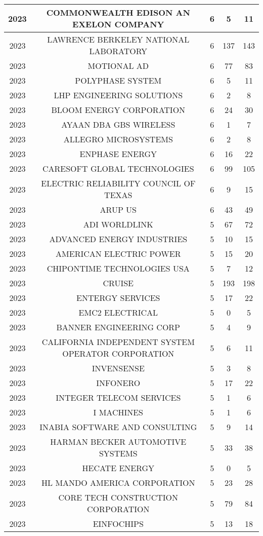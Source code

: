 \documentclass{article}%
\begin{document}
\begin{longtable}{c|c|c|c|c}
2023&COMMONWEALTH EDISON AN EXELON COMPANY&6&5&11\\%
\hline%
2023&LAWRENCE BERKELEY NATIONAL LABORATORY&6&137&143\\%
\hline%
2023&MOTIONAL AD&6&77&83\\%
\hline%
2023&POLYPHASE SYSTEM&6&5&11\\%
\hline%
2023&LHP ENGINEERING SOLUTIONS&6&2&8\\%
\hline%
2023&BLOOM ENERGY CORPORATION&6&24&30\\%
\hline%
2023&AYAAN  DBA GBS WIRELESS&6&1&7\\%
\hline%
2023&ALLEGRO MICROSYSTEMS&6&2&8\\%
\hline%
2023&ENPHASE ENERGY&6&16&22\\%
\hline%
2023&CARESOFT GLOBAL TECHNOLOGIES&6&99&105\\%
\hline%
2023&ELECTRIC RELIABILITY COUNCIL OF TEXAS&6&9&15\\%
\hline%
2023&ARUP US&6&43&49\\%
\hline%
2023&ADI WORLDLINK&5&67&72\\%
\hline%
2023&ADVANCED ENERGY INDUSTRIES&5&10&15\\%
\hline%
2023&AMERICAN ELECTRIC POWER&5&15&20\\%
\hline%
2023&CHIPONTIME TECHNOLOGIES USA&5&7&12\\%
\hline%
2023&CRUISE&5&193&198\\%
\hline%
2023&ENTERGY SERVICES&5&17&22\\%
\hline%
2023&EMC2 ELECTRICAL&5&0&5\\%
\hline%
2023&BANNER ENGINEERING CORP&5&4&9\\%
\hline%
2023&CALIFORNIA INDEPENDENT SYSTEM OPERATOR CORPORATION&5&6&11\\%
\hline%
2023&INVENSENSE&5&3&8\\%
\hline%
2023&INFONERO&5&17&22\\%
\hline%
2023&INTEGER TELECOM SERVICES&5&1&6\\%
\hline%
2023&I MACHINES&5&1&6\\%
\hline%
2023&INABIA SOFTWARE AND CONSULTING&5&9&14\\%
\hline%
2023&HARMAN BECKER AUTOMOTIVE SYSTEMS&5&33&38\\%
\hline%
2023&HECATE ENERGY&5&0&5\\%
\hline%
2023&HL MANDO AMERICA CORPORATION&5&23&28\\%
\hline%
2023&CORE TECH CONSTRUCTION CORPORATION&5&79&84\\%
\hline%
2023&EINFOCHIPS&5&13&18\\%

\end{longtable}
\end{document}
